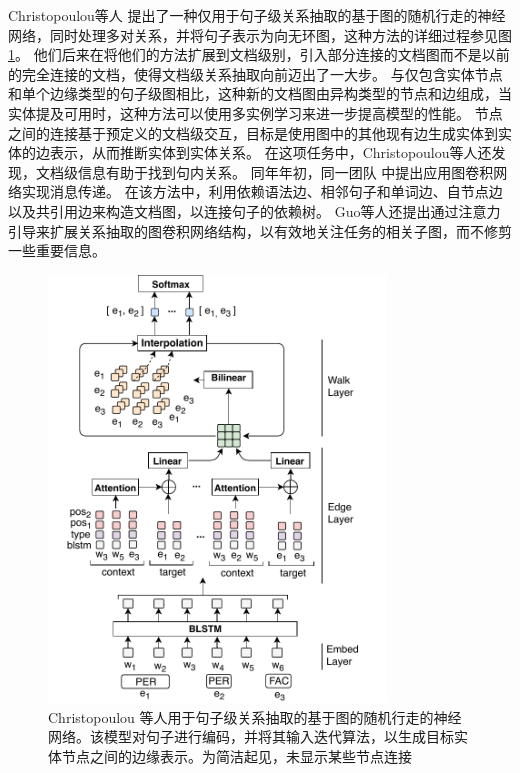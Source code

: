 \documentclass[bachelor]{thesis-uestc}
\begin{document}
Christopoulou等人 提出了一种仅用于句子级关系抽取的基于图的随机行走的神经网络，同时处理多对关系，并将句子表示为向无环图，这种方法的详细过程参见图 \ref{fig_christopoulou}。
他们后来在将他们的方法扩展到文档级别，引入部分连接的文档图而不是以前的完全连接的文档，使得文档级关系抽取向前迈出了一大步。
与仅包含实体节点和单个边缘类型的句子级图相比，这种新的文档图由异构类型的节点和边组成，当实体提及可用时，这种方法可以使用多实例学习来进一步提高模型的性能。
节点之间的连接基于预定义的文档级交互，目标是使用图中的其他现有边生成实体到实体的边表示，从而推断实体到实体关系。
在这项任务中，Christopoulou等人还发现，文档级信息有助于找到句内关系。
同年年初，同一团队 \cite{sahu2019inter}中提出应用图卷积网络实现消息传递。
在该方法中，利用依赖语法边、相邻句子和单词边、自节点边以及共引用边来构造文档图，以连接句子的依赖树。
Guo等人还提出通过注意力引导来扩展关系抽取的图卷积网络结构，以有效地关注任务的相关子图，而不修剪一些重要信息。\par
\begin{figure}
    \centering
    \includegraphics[width=0.8\textwidth]{misc/graph_model.pdf}
    \caption{Christopoulou 等人用于句子级关系抽取的基于图的随机行走的神经网络。该模型对句子进行编码，并将其输入迭代算法，以生成目标实体节点之间的边缘表示。为简洁起见，未显示某些节点连接}
    \label{fig_christopoulou}
\end{figure}
\end{document}
